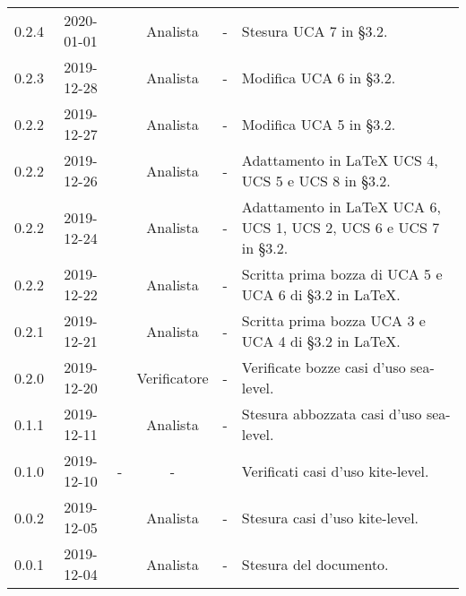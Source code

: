 {\begin{longtable}{ c c  C{2.5cm} c c C{3.5cm}}
0.2.4 & 2020-01-01 & \PF{} & Analista & - & Stesura UCA 7 in §3.2. \\

0.2.3 & 2019-12-28 & \DF{} & Analista & - & Modifica UCA 6 in §3.2. \\

0.2.2 & 2019-12-27 & \PF{} & Analista & - & Modifica UCA 5 in §3.2. \\

0.2.2 & 2019-12-26 & \CE{} & Analista & - & Adattamento in \LaTeX{} UCS 4, UCS 5 e UCS 8 in §3.2. \\

0.2.2 & 2019-12-24 & \DF{} & Analista & - & Adattamento in \LaTeX{} UCA 6, UCS 1, UCS 2, UCS 6 e UCS 7 in §3.2. \\

0.2.2 & 2019-12-22 & \PF{} & Analista & - & Scritta prima bozza di UCA 5 e UCA 6 di §3.2 in \LaTeX. \\

0.2.1 & 2019-12-21 & \PF{} & Analista & - & Scritta prima bozza UCA 3 e UCA 4 di §3.2 in \LaTeX. \\

0.2.0 & 2019-12-20 & \SE{} & Verificatore & - & Verificate bozze casi d'uso sea-level. \\

0.1.1 & 2019-12-11 & \DF{} & Analista & - & Stesura abbozzata casi d'uso sea-level. \\

0.1.0 & 2019-12-10 & - & - & \BR{} & Verificati casi d'uso kite-level. \\

0.0.2 & 2019-12-05 & \CE{} & Analista & - & Stesura casi d'uso kite-level. \\

0.0.1 & 2019-12-04 & \CE{} & Analista & - & Stesura del documento. \\		
		
\end{longtable}
}